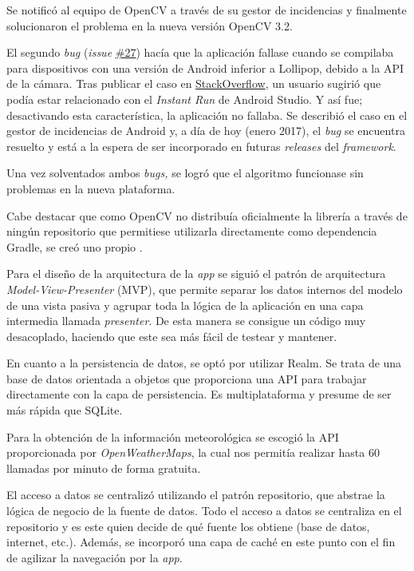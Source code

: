 Se notificó al equipo de OpenCV a través de su gestor de incidencias y
finalmente solucionaron el problema en la nueva versión OpenCV 3.2.

El segundo \emph{bug} (\emph{issue}
\href{https://github.com/davidmigloz/go-bees/issues/27}{\#27}) hacía que
la aplicación fallase cuando se compilaba para dispositivos con una
versión de Android inferior a Lollipop, debido a la API de la cámara.
Tras publicar el caso en
\href{http://stackoverflow.com/questions/39770355/classnotfoundexception-android-hardware-camera2-cameraaccessexception-with-open}{StackOverflow},
un usuario sugirió que podía estar relacionado con el \emph{Instant Run}
de Android Studio. Y así fue; desactivando esta característica, la
aplicación no fallaba. Se describió el caso en el gestor de incidencias
de Android y, a día de hoy (enero 2017), el \emph{bug} se encuentra
resuelto y está a la espera de ser incorporado en futuras
\emph{releases} del \emph{framework}.

Una vez solventados ambos \emph{bugs,} se logró que el algoritmo
funcionase sin problemas en la nueva plataforma.

Cabe destacar que como OpenCV no distribuía oficialmente la librería a
través de ningún repositorio que permitiese utilizarla directamente como
dependencia Gradle, se creó uno propio \citep{gobees:prototipes}.

Para el diseño de la arquitectura de la \emph{app} se siguió el patrón
de arquitectura \emph{Model-View-Presenter} (MVP), que permite separar
los datos internos del modelo de una vista pasiva y agrupar toda la
lógica de la aplicación en una capa intermedia llamada \emph{presenter}.
De esta manera se consigue un código muy desacoplado, haciendo que este
sea más fácil de testear y mantener.

En cuanto a la persistencia de datos, se optó por utilizar Realm. Se
trata de una base de datos orientada a objetos que proporciona una API
para trabajar directamente con la capa de persistencia. Es
multiplataforma y presume de ser más rápida que SQLite.

Para la obtención de la información meteorológica se escogió la API
proporcionada por \emph{OpenWeatherMaps}, la cual nos permitía realizar
hasta 60 llamadas por minuto de forma gratuita.

El acceso a datos se centralizó utilizando el patrón repositorio, que
abstrae la lógica de negocio de la fuente de datos. Todo el acceso a
datos se centraliza en el repositorio y es este quien decide de qué
fuente los obtiene (base de datos, internet, etc.). Además, se incorporó
una capa de caché en este punto con el fin de agilizar la navegación por
la \emph{app}.

